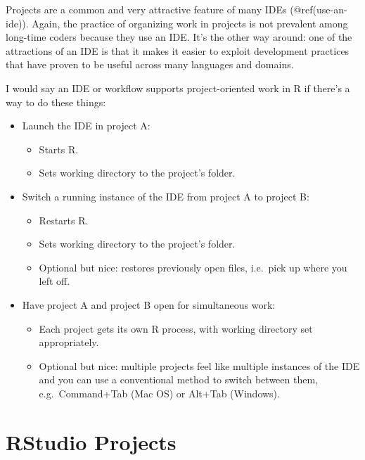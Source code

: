 \documentclass[
  letterpaper,
]{book}
\providecommand{\tightlist}{%
  \setlength{\itemsep}{0pt}\setlength{\parskip}{0pt}}\usepackage{longtable,booktabs,array}
\begin{document}
Projects are a common and very attractive feature of many IDEs
(@ref(use-an-ide)). Again, the practice of organizing work in projects
is not prevalent among long-time coders because they use an IDE. It's
the other way around: one of the attractions of an IDE is that it makes
it easier to exploit development practices that have proven to be useful
across many languages and domains.

I would say an IDE or workflow supports project-oriented work in R if
there's a way to do these things:

\begin{itemize}
\tightlist
\item
  Launch the IDE in project A:

  \begin{itemize}
  \tightlist
  \item
    Starts R.
  \item
    Sets working directory to the project's folder.
  \end{itemize}
\item
  Switch a running instance of the IDE from project A to project B:

  \begin{itemize}
  \tightlist
  \item
    Restarts R.
  \item
    Sets working directory to the project's folder.
  \item
    Optional but nice: restores previously open files, i.e.~pick up
    where you left off.
  \end{itemize}
\item
  Have project A and project B open for simultaneous work:

  \begin{itemize}
  \tightlist
  \item
    Each project gets its own R process, with working directory set
    appropriately.
  \item
    Optional but nice: multiple projects feel like multiple instances of
    the IDE and you can use a conventional method to switch between
    them, e.g.~Command+Tab (Mac OS) or Alt+Tab (Windows).
  \end{itemize}
\end{itemize}

\hypertarget{rstudio-projects}{%
\section{RStudio Projects}\label{rstudio-projects}}
\end{document}
